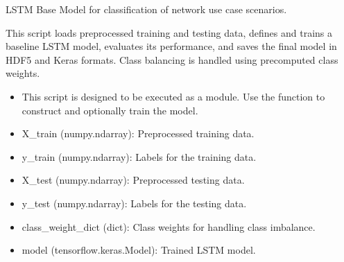 \documentclass[letterpaper,10pt,english]{sphinxmanual}
\begin{document}
\begin{fulllineitems}
\label{\detokenize{lstm_base_model:lstm_base_model.build_base_model}}
\pysigstartsignatures
{}
\pysigstopsignatures
\sphinxAtStartPar
LSTM Base Model for classification of network use case scenarios.

\sphinxAtStartPar
This script loads preprocessed training and testing data, defines and trains
a baseline LSTM model, evaluates its performance, and saves the final model
in HDF5 and Keras formats. Class balancing is handled using precomputed class weights.
\begin{description}
\begin{itemize}
\item {} 
\sphinxAtStartPar
This script is designed to be executed as a module. Use the function  to construct and optionally train the model.

\end{itemize}

\begin{itemize}
\item {} 
\sphinxAtStartPar
X\_train (numpy.ndarray): Preprocessed training data.

\item {} 
\sphinxAtStartPar
y\_train (numpy.ndarray): Labels for the training data.

\item {} 
\sphinxAtStartPar
X\_test (numpy.ndarray): Preprocessed testing data.

\item {} 
\sphinxAtStartPar
y\_test (numpy.ndarray): Labels for the testing data.

\item {} 
\sphinxAtStartPar
class\_weight\_dict (dict): Class weights for handling class imbalance.

\end{itemize}

\begin{itemize}
\item {} 
\sphinxAtStartPar
model (tensorflow.keras.Model): Trained LSTM model.

\end{itemize}

\end{description}

\end{fulllineitems}
\end{document}
